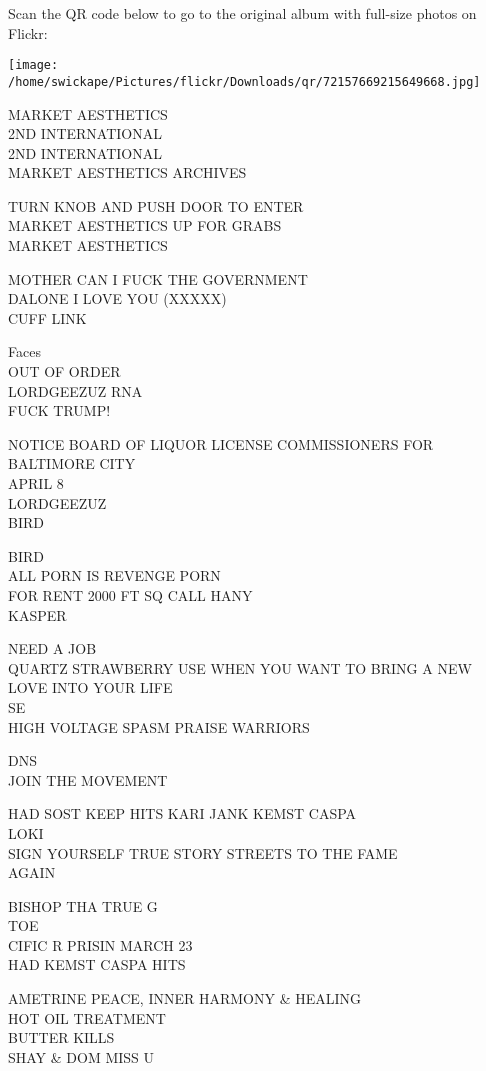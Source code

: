 \documentclass[10pt,letterpaper]{article}
\begin{document}
Scan the QR code below to go to the original album with full-size photos on Flickr:

\texttt{[image: /home/swickape/Pictures/flickr/Downloads/qr/72157669215649668.jpg]}


MARKET AESTHETICS\\
2ND INTERNATIONAL\\
2ND INTERNATIONAL\\
MARKET AESTHETICS ARCHIVES

TURN KNOB AND PUSH DOOR TO ENTER\\
MARKET AESTHETICS UP FOR GRABS\\
MARKET AESTHETICS

MOTHER CAN I FUCK THE GOVERNMENT\\
DALONE I LOVE YOU (XXXXX)\\
CUFF LINK

Faces\\
OUT OF ORDER\\
LORDGEEZUZ RNA\\
FUCK TRUMP!

NOTICE BOARD OF LIQUOR LICENSE COMMISSIONERS FOR BALTIMORE CITY\\
APRIL 8\\
LORDGEEZUZ\\
BIRD

BIRD\\
ALL PORN IS REVENGE PORN\\
FOR RENT 2000 FT SQ CALL HANY\\
KASPER

NEED A JOB\\
QUARTZ STRAWBERRY USE WHEN YOU WANT TO BRING A NEW LOVE INTO YOUR LIFE\\
SE\\
HIGH VOLTAGE SPASM PRAISE WARRIORS

DNS\\
JOIN THE MOVEMENT

HAD SOST KEEP HITS KARI JANK KEMST CASPA\\
LOKI\\
SIGN YOURSELF TRUE STORY STREETS TO THE FAME\\
AGAIN

BISHOP THA TRUE G\\
TOE\\
CIFIC R PRISIN MARCH 23\\
HAD KEMST CASPA HITS

AMETRINE PEACE, INNER HARMONY \& HEALING\\
HOT OIL TREATMENT\\
BUTTER KILLS\\
SHAY \& DOM MISS U
\end{document}

